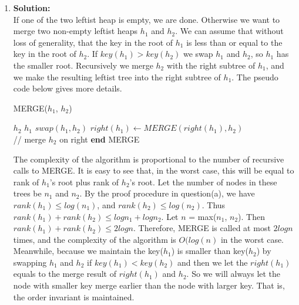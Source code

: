 \begin{enumerate}[label=(\alph*)]
	\item \textbf{Solution:} \\
	If one of the two leftist heap is empty, we are done. Otherwise we want to merge two non-empty leftist heaps $h_1$ and $h_2$. We can assume that without loss of generality, that the key in the root of $h_1$ is less than or equal to the key in the root of $h_2$. If $key(h_1) > key(h_2)$ we swap $h_1$ and $h_2$, so $h_1$ has the smaller root. Recursively we merge $h_2$ with the right subtree of $h_1$, and we make the resulting leftist tree into the right subtree of $h_1$. The pseudo code below gives more details. 
	\begin{algorithm}
	\caption{MERGE($h_1$, $h_2$)}\label{euclid}
	\begin{algorithmic}
	 \Return $h_2$
	 \Return $h_1$
	\Else
		\State $swap(h_1, h_2)$
		\EndIf
		$right(h_1) \gets MERGE(right(h_1), h_2) $ \\
		// merge $h_2$ on right 
	\EndIf
	\State \textbf{end} MERGE
	\end{algorithmic}
	\end{algorithm}
	The complexity of the algorithm is proportional to the number of recursive calls to MERGE.  It is easy to see that, in the worst case, this will be equal to rank of $h_1$'s root plus rank of $h_2$'s root. Let the number of nodes in these trees be $n_1$ and $n_2$. By the proof procedure in question(a), we have $rank(h_1) \leq log(n_1)$, and $rank(h_2) \leq log(n_2)$. Thus $rank(h_1) + rank(h_2) \leq logn_1 + logn_2$. Let $n$ = max($n_1$, $n_2$). Then $rank(h_1) + rank(h_2) \leq 2logn$. Therefore, MERGE is called at most $2logn$ times, and the complexity of the algorithm is $O(log(n)$ in the worst case. \\

	Meanwhile, because we maintain the key($h_1$) is smaller than key($h_2$) by swapping $h_1$ and $h_2$ if $key(h_1) < key(h_2)$ and then we let the $right(h_1)$ equals to the merge result of $right(h_1)$ and $h_2$. So we will always let the node with smaller key merge earlier than the node with larger key. That is, the order invariant is maintained. 


\end{enumerate}
